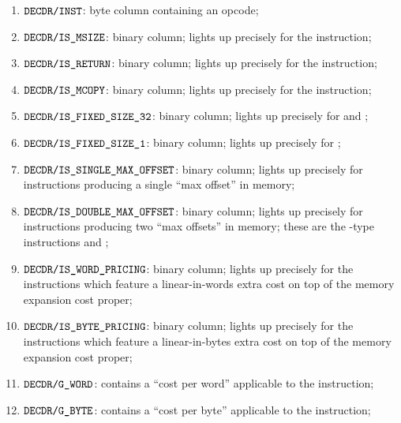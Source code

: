 \begin{enumerate}
	\item $\texttt{DECDR}\texttt{/}{\texttt{\texttt{INST}}}$:
		byte column containing an opcode;
	\item $\texttt{DECDR}\texttt{/}{\texttt{\texttt{IS\_MSIZE}}}$:
		binary column;
		lights up precisely for the  instruction;
	\item $\texttt{DECDR}\texttt{/}{\texttt{\texttt{IS\_RETURN}}}$:
		binary column;
		lights up precisely for the  instruction;
	\item $\texttt{DECDR}\texttt{/}{\texttt{\texttt{IS\_MCOPY}}}$:
		binary column;
		lights up precisely for the  instruction;
	\item $\texttt{DECDR}\texttt{/}{\texttt{\texttt{IS\_FIXED\_SIZE\_32}}}$:
		binary column;
		lights up precisely for  and ;
	\item $\texttt{DECDR}\texttt{/}{\texttt{\texttt{IS\_FIXED\_SIZE\_1}}}$:
		binary column;
		lights up precisely for ;
	\item $\texttt{DECDR}\texttt{/}{\texttt{\texttt{IS\_SINGLE\_MAX\_OFFSET}}}$:
		binary column;
		lights up precisely for instructions producing a single ``max offset'' in memory;
	\item $\texttt{DECDR}\texttt{/}{\texttt{\texttt{IS\_DOUBLE\_MAX\_OFFSET}}}$:
		binary column;
		lights up precisely for instructions producing two ``max offsets'' in memory;
		these are the -type instructions and ;
	\item $\texttt{DECDR}\texttt{/}{\texttt{\texttt{IS\_WORD\_PRICING}}}$:
		binary column;
		lights up precisely for the instructions which feature a linear-in-words extra cost on top of the memory expansion cost proper;
	\item $\texttt{DECDR}\texttt{/}{\texttt{\texttt{IS\_BYTE\_PRICING}}}$:
		binary column;
		lights up precisely for the instructions which feature a linear-in-bytes extra cost on top of the memory expansion cost proper;
	\item $\texttt{DECDR}\texttt{/}{\texttt{\texttt{G\_WORD}}}$:
		contains a ``cost per \evm{} word'' applicable to the instruction;
	\item $\texttt{DECDR}\texttt{/}{\texttt{\texttt{G\_BYTE}}}$:
		contains a ``cost per \evm{} byte'' applicable to the instruction;
\end{enumerate}
